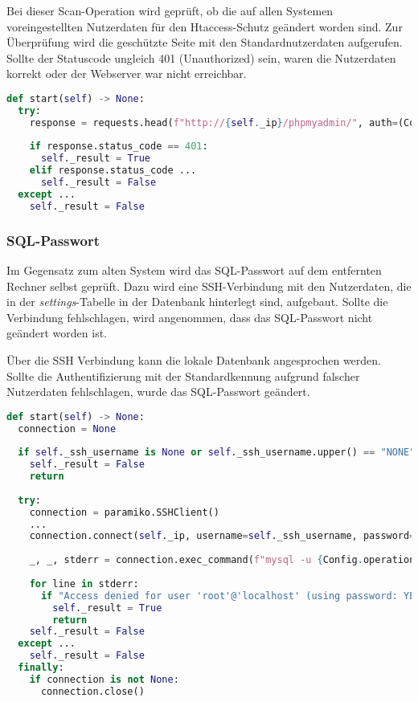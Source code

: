 Bei dieser Scan-Operation wird geprüft, ob die auf allen Systemen voreingestellten Nutzerdaten für den Htaccess-Schutz geändert worden sind. Zur Überprüfung wird die geschützte Seite mit den Standardnutzerdaten aufgerufen. Sollte der Statuscode ungleich 401 (Unauthorized) sein, waren die Nutzerdaten korrekt oder der Webserver war nicht erreichbar.
\begin{lstlisting}[language=Python, frame=single, caption={Big Brother Htaccess}, captionpos=b, label={lst:bigbrother-htaccess}]
def start(self) -> None:
  try:
    response = requests.head(f"http://{self._ip}/phpmyadmin/", auth=(Config.operations['htaccess']['username'], Config.operations['htaccess']['password']))
    
    if response.status_code == 401:
      self._result = True
    elif response.status_code ...
      self._result = False
  except ...
    self._result = False
\end{lstlisting}

\subsubsection{SQL-Passwort}

Im Gegensatz zum alten System wird das SQL-Passwort auf dem entfernten Rechner selbst geprüft.
Dazu wird eine SSH-Verbindung mit den Nutzerdaten, die in der \textit{settings}-Tabelle in der Datenbank hinterlegt sind, aufgebaut. Sollte die Verbindung fehlschlagen, wird angenommen, dass das SQL-Passwort nicht geändert worden ist.

Über die SSH Verbindung kann die lokale Datenbank angesprochen werden. Sollte die Authentifizierung mit der Standardkennung aufgrund falscher Nutzerdaten fehlschlagen, wurde das SQL-Passwort geändert.

\begin{lstlisting}[language=Python, frame=single, caption={Big Brother SQL-Passwort}, captionpos=b, label={lst:bigbrother-sql-password}]
def start(self) -> None:
  connection = None
  
  if self._ssh_username is None or self._ssh_username.upper() == "NONE" or self._ssh_password is None or self._ssh_password.upper() == "NONE":
    self._result = False
    return
  
  try:
    connection = paramiko.SSHClient()
    ...
    connection.connect(self._ip, username=self._ssh_username, password=self._ssh_password, timeout=Config.operations['base']['ssh_timeout'])
    
    _, _, stderr = connection.exec_command(f"mysql -u {Config.operations['sql']['username']} -p{Config.operations['sql']['password']} -e 'quit'")
    
    for line in stderr:
      if "Access denied for user 'root'@'localhost' (using password: YES)" in line.strip('\n'):
        self._result = True
        return
    self._result = False
  except ...
    self._result = False
  finally:
    if connection is not None:
      connection.close()
\end{lstlisting}

